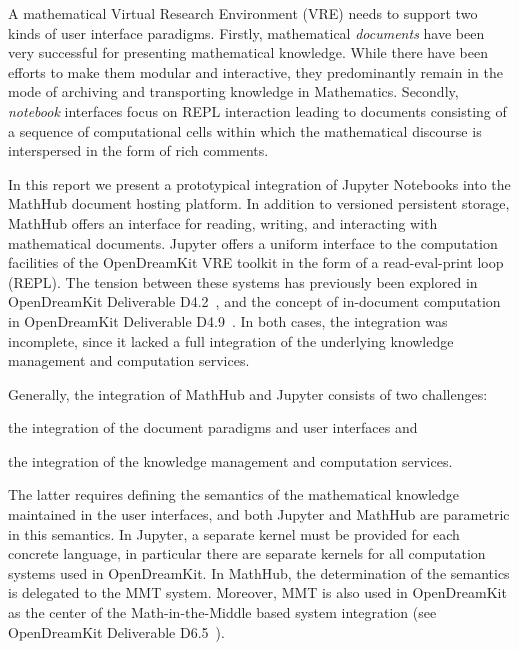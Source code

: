 A mathematical Virtual Research Environment (VRE) needs to support two kinds of user interface paradigms.
Firstly, mathematical \emph{documents} have been very successful for presenting mathematical knowledge.
While there have been efforts to make them modular and interactive, they predominantly remain in the mode of archiving and transporting knowledge in Mathematics.
Secondly, \emph{notebook} interfaces focus on REPL interaction leading to documents consisting of a sequence of computational cells within which the mathematical discourse is interspersed in the form of rich comments.

In this report we present a prototypical integration of Jupyter Notebooks into the MathHub document hosting platform.
In addition to versioned persistent storage, MathHub offers an interface for reading, writing, and interacting with mathematical documents.
Jupyter offers a uniform interface to the computation facilities of the OpenDreamKit VRE toolkit in the form of a read-eval-print loop (REPL).
The tension between these systems has previously been explored in OpenDreamKit Deliverable D4.2~\cite{ODK-D4.2}, and the concept of in-document computation in OpenDreamKit Deliverable D4.9~\cite{ODK-D4.9}.
In both cases, the integration was incomplete, since it lacked a full integration of the underlying knowledge management and computation services.

Generally, the integration of MathHub and Jupyter consists of two challenges:
\begin{inparaenum}[\em a\rm )]
\item the integration of the document paradigms and user interfaces and
\item the integration of the knowledge management and computation services.
\end{inparaenum}
The latter requires defining the semantics of the mathematical knowledge maintained in the user interfaces, and both Jupyter and MathHub are parametric in this semantics.
In Jupyter, a separate kernel must be provided for each concrete language, in particular there are separate kernels for all computation systems used in OpenDreamKit.
In MathHub, the determination of the semantics is delegated to the MMT system.
Moreover, MMT is also used in OpenDreamKit as the center of the Math-in-the-Middle based system integration (see OpenDreamKit Deliverable D6.5~\cite{ODK-D6.5}).

